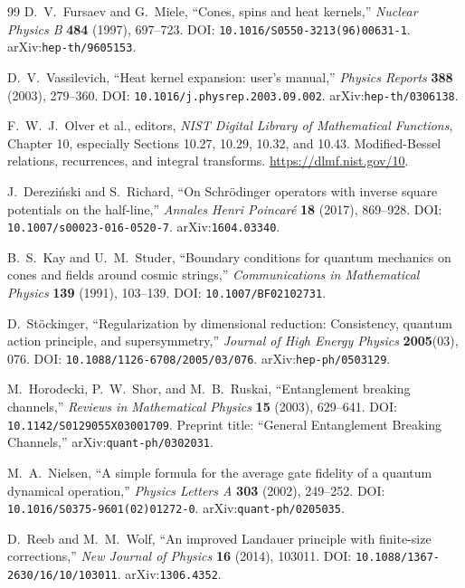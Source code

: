 \documentclass[11pt,a4paper]{article}
\theoremstyle{plain}
\theoremstyle{definition}
\theoremstyle{remark}
\numberwithin{equation}{section}
\begin{document}
\begin{thebibliography}{99}
\dag D.~V.~Fursaev and G.~Miele,
``Cones, spins and heat kernels,''
\emph{Nuclear Physics B} \textbf{484} (1997), 697--723.
DOI: \nolinkurl{10.1016/S0550-3213(96)00631-1}.
arXiv:\nolinkurl{hep-th/9605153}.

\dag D.~V.~Vassilevich,
``Heat kernel expansion: user's manual,''
\emph{Physics Reports} \textbf{388} (2003), 279--360.
DOI: \nolinkurl{10.1016/j.physrep.2003.09.002}.
arXiv:\nolinkurl{hep-th/0306138}.

\dag F.~W.~J.~Olver et al., editors,
\emph{NIST Digital Library of Mathematical Functions},
Chapter 10, especially Sections 10.27, 10.29, 10.32, and 10.43.
Modified-Bessel relations, recurrences, and integral transforms.
\url{https://dlmf.nist.gov/10}.

\dag J.~Derezi\'nski and S.~Richard,
``On Schr\"odinger operators with inverse square potentials on
the half-line,''
\emph{Annales Henri Poincar\'e} \textbf{18} (2017), 869--928.
DOI: \nolinkurl{10.1007/s00023-016-0520-7}.
arXiv:\nolinkurl{1604.03340}.

\dag B.~S.~Kay and U.~M.~Studer,
``Boundary conditions for quantum mechanics on cones and fields
around cosmic strings,''
\emph{Communications in Mathematical Physics}
\textbf{139} (1991), 103--139.
DOI: \nolinkurl{10.1007/BF02102731}.

\dag D.~St\"ockinger,
``Regularization by dimensional reduction:
Consistency, quantum action principle, and supersymmetry,''
\emph{Journal of High Energy Physics} \textbf{2005}(03), 076.
DOI: \nolinkurl{10.1088/1126-6708/2005/03/076}.
arXiv:\nolinkurl{hep-ph/0503129}.

\dag M.~Horodecki, P.~W.~Shor, and M.~B.~Ruskai,
``Entanglement breaking channels,''
\emph{Reviews in Mathematical Physics} \textbf{15} (2003),
629--641.
DOI: \nolinkurl{10.1142/S0129055X03001709}.
Preprint title: ``General Entanglement Breaking Channels,''
arXiv:\nolinkurl{quant-ph/0302031}.

\dag M.~A.~Nielsen,
``A simple formula for the average gate fidelity of a quantum
dynamical operation,''
\emph{Physics Letters A} \textbf{303} (2002), 249--252.
DOI: \nolinkurl{10.1016/S0375-9601(02)01272-0}.
arXiv:\nolinkurl{quant-ph/0205035}.

\dag D.~Reeb and M.~M.~Wolf,
``An improved Landauer principle with finite-size corrections,''
\emph{New Journal of Physics} \textbf{16} (2014), 103011.
DOI: \nolinkurl{10.1088/1367-2630/16/10/103011}.
arXiv:\nolinkurl{1306.4352}.

\end{thebibliography}
\end{document}
